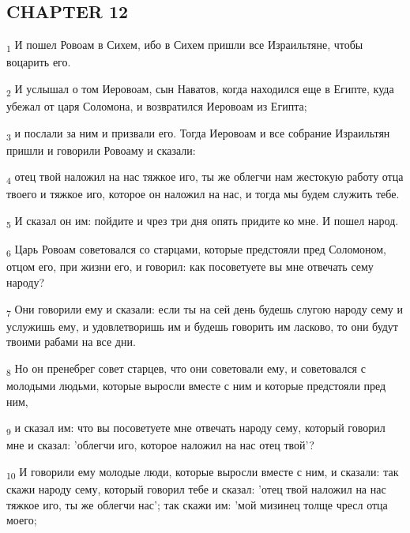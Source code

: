 \subsection{CHAPTER 12}
\begin{tcolorbox}
\textsubscript{1} И пошел Ровоам в Сихем, ибо в Сихем пришли все Израильтяне, чтобы воцарить его.
\end{tcolorbox}
\begin{tcolorbox}
\textsubscript{2} И услышал о том Иеровоам, сын Наватов, когда находился еще в Египте, куда убежал от царя Соломона, и возвратился Иеровоам из Египта;
\end{tcolorbox}
\begin{tcolorbox}
\textsubscript{3} и послали за ним и призвали его. Тогда Иеровоам и все собрание Израильтян пришли и говорили Ровоаму и сказали:
\end{tcolorbox}
\begin{tcolorbox}
\textsubscript{4} отец твой наложил на нас тяжкое иго, ты же облегчи нам жестокую работу отца твоего и тяжкое иго, которое он наложил на нас, и тогда мы будем служить тебе.
\end{tcolorbox}
\begin{tcolorbox}
\textsubscript{5} И сказал он им: пойдите и чрез три дня опять придите ко мне. И пошел народ.
\end{tcolorbox}
\begin{tcolorbox}
\textsubscript{6} Царь Ровоам советовался со старцами, которые предстояли пред Соломоном, отцом его, при жизни его, и говорил: как посоветуете вы мне отвечать сему народу?
\end{tcolorbox}
\begin{tcolorbox}
\textsubscript{7} Они говорили ему и сказали: если ты на сей день будешь слугою народу сему и услужишь ему, и удовлетворишь им и будешь говорить им ласково, то они будут твоими рабами на все дни.
\end{tcolorbox}
\begin{tcolorbox}
\textsubscript{8} Но он пренебрег совет старцев, что они советовали ему, и советовался с молодыми людьми, которые выросли вместе с ним и которые предстояли пред ним,
\end{tcolorbox}
\begin{tcolorbox}
\textsubscript{9} и сказал им: что вы посоветуете мне отвечать народу сему, который говорил мне и сказал: 'облегчи иго, которое наложил на нас отец твой'?
\end{tcolorbox}
\begin{tcolorbox}
\textsubscript{10} И говорили ему молодые люди, которые выросли вместе с ним, и сказали: так скажи народу сему, который говорил тебе и сказал: 'отец твой наложил на нас тяжкое иго, ты же облегчи нас'; так скажи им: 'мой мизинец толще чресл отца моего;
\end{tcolorbox}

